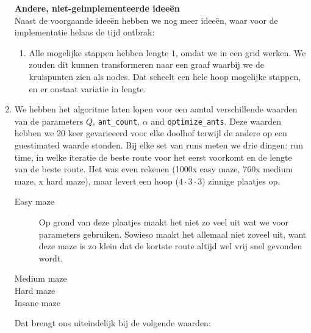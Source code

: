 \documentclass[a4paper,10pt,fleqn]{article}
\begin{document}
\begin{enumerate}[1.]
        \textbf{Andere, niet-geimplementeerde ideeën} \\
        Naast de voorgaande ideeën hebben we nog meer ideeën, waar voor de implementatie helaas de tijd ontbrak:
          \begin{enumerate}[-]
              \item Alle mogelijke stappen hebben lengte $1$, omdat we in een grid werken. We zouden dit kunnen transformeren naar een graaf waarbij we de kruispunten zien als nodes. Dat scheelt een hele hoop mogelijke stappen, en er onstaat variatie in lengte.
          \end{enumerate}


    \item We hebben het algoritme laten lopen voor een aantal verschillende waarden van de parameters $Q$, \verb|ant_count|, $\alpha$ and \verb|optimize_ants|. Deze waarden hebben we 20 keer gevarieeerd voor elke doolhof terwijl de andere op een guestimated waarde stonden. Bij elke set van runs meten we drie dingen: run time, in welke iteratie de beste route voor het eerst voorkomt   en de lengte van de beste route.
    Het was even rekenen (1000x easy maze, 760x medium maze, x hard maze), maar levert een hoop ($4 \cdot 3 \cdot 3$) zinnige plaatjes op.

    \begin{description}
        \item[Easy maze] Op grond van deze plaatjes maakt het niet zo veel uit wat we voor parameters gebruiken. Sowieso maakt het allemaal niet zoveel uit, want deze maze is zo klein dat de kortste route altijd wel vrij snel gevonden wordt.
        \item[Medium maze]
        \item[Hard maze]
        \item[Insane maze]
    \end{description}

    Dat brengt ons uiteindelijk bij de volgende waarden:


\end{enumerate}
\end{document}
